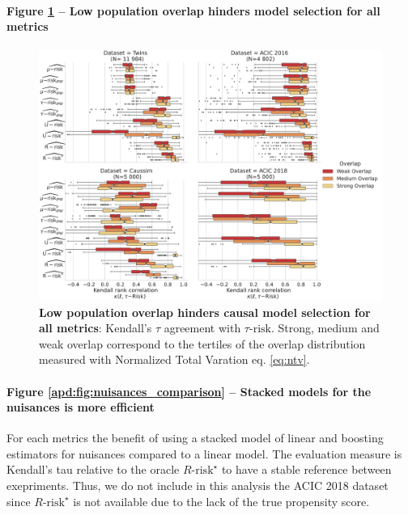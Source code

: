 \documentclass[french,12pt,twoside,a4paper]{book}
\begin{document}
\begin{appendices}
  \paragraph{Figure \ref{apd:fig:all_datasets_overlap_effect} -- Low population
    overlap hinders model selection for all metrics}



  \begin{figure}
    \centering
    \includegraphics[width=\textwidth]{img/chapter_5/_2_overlap_influence_overlap_by_bin_comparaison_kendall_by_Dataset.pdf}
    \hfill
    \caption{\textbf{Low population overlap hinders causal model selection for all
        metrics}:
      Kendall's $\tau$ agreement with $\tau\text{-risk}$. Strong, medium and weak overlap
      correspond
      to the tertiles of the overlap distribution measured with Normalized Total
      Varation eq. \ref{eq:ntv}.}\label{apd:fig:all_datasets_overlap_effect}
  \end{figure}


  \paragraph{Figure \ref{apd:fig:nuisances_comparison} -- Stacked models for the nuisances is more efficient}
  For each metrics the benefit of
  using a stacked model of linear and boosting estimators for nuisances compared
  to a linear model. The evaluation measure is Kendall's tau relative to the
  oracle $R\text{-risk}^{\star}$ to have a stable reference between exepriments.
  Thus, we do not include in this analysis the ACIC 2018 dataset since
  $R\text{-risk}^{\star}$ is not available due to the lack of the true propensity
  score.


\end{appendices}
\end{document}
